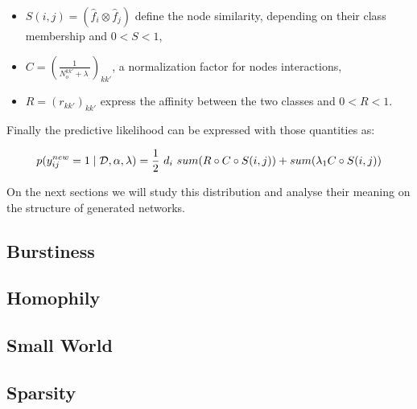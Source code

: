 \documentclass[a4paper, 12pt]{article}
\begin{document}
\begin{itemize}
\item $S(i,j) = (\hat f_i \otimes \hat f_j)$ define the node similarity, depending on their class membership and $0<S<1$, \\
\item $C = (\frac{1}{N_o^{kk'} + \lambda_{.}})_{kk'}$, a normalization factor for nodes interactions, \\
\item $R = (r_{kk'})_{kk'}$ express the affinity between the two classes and $0<R<1$.
\end{itemize}

Finally the predictive likelihood can be expressed with those quantities as:

\begin{equation}
p(y_{ij}^{new}=1 \mid \mathcal{D}, \alpha, \lambda)= \frac{1}{2}\ d_i\ sum(R \circ C \circ S(i,j)) + sum(\lambda_1 C\circ S(i,j))
\end{equation}

On the next sections we will study this distribution and analyse their meaning on the structure of generated networks.





\subsection{Burstiness}


\subsection{Homophily}

\subsection{Small World}

\subsection{Sparsity}
\end{document}
